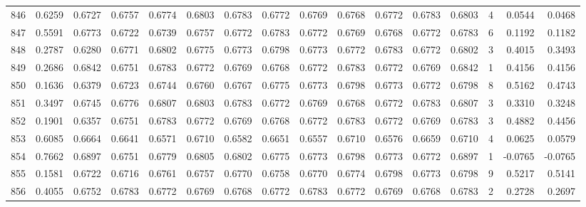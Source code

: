 \begin{tabular}{lrrrrrrrrrrrrrrr}
846 &      0.6259 &  0.6727 &  0.6757 &  0.6774 &  0.6803 &  0.6783 &  0.6772 &  0.6769 &  0.6768 &  0.6772 &   0.6783 &     0.6803 &      4 &                    0.0544 &                     0.0468 \\
847 &      0.5591 &  0.6773 &  0.6722 &  0.6739 &  0.6757 &  0.6772 &  0.6783 &  0.6772 &  0.6769 &  0.6768 &   0.6772 &     0.6783 &      6 &                    0.1192 &                     0.1182 \\
848 &      0.2787 &  0.6280 &  0.6771 &  0.6802 &  0.6775 &  0.6773 &  0.6798 &  0.6773 &  0.6772 &  0.6783 &   0.6772 &     0.6802 &      3 &                    0.4015 &                     0.3493 \\
849 &      0.2686 &  0.6842 &  0.6751 &  0.6783 &  0.6772 &  0.6769 &  0.6768 &  0.6772 &  0.6783 &  0.6772 &   0.6769 &     0.6842 &      1 &                    0.4156 &                     0.4156 \\
850 &      0.1636 &  0.6379 &  0.6723 &  0.6744 &  0.6760 &  0.6767 &  0.6775 &  0.6773 &  0.6798 &  0.6773 &   0.6772 &     0.6798 &      8 &                    0.5162 &                     0.4743 \\
851 &      0.3497 &  0.6745 &  0.6776 &  0.6807 &  0.6803 &  0.6783 &  0.6772 &  0.6769 &  0.6768 &  0.6772 &   0.6783 &     0.6807 &      3 &                    0.3310 &                     0.3248 \\
852 &      0.1901 &  0.6357 &  0.6751 &  0.6783 &  0.6772 &  0.6769 &  0.6768 &  0.6772 &  0.6783 &  0.6772 &   0.6769 &     0.6783 &      3 &                    0.4882 &                     0.4456 \\
853 &      0.6085 &  0.6664 &  0.6641 &  0.6571 &  0.6710 &  0.6582 &  0.6651 &  0.6557 &  0.6710 &  0.6576 &   0.6659 &     0.6710 &      4 &                    0.0625 &                     0.0579 \\
854 &      0.7662 &  0.6897 &  0.6751 &  0.6779 &  0.6805 &  0.6802 &  0.6775 &  0.6773 &  0.6798 &  0.6773 &   0.6772 &     0.6897 &      1 &                   -0.0765 &                    -0.0765 \\
855 &      0.1581 &  0.6722 &  0.6716 &  0.6761 &  0.6757 &  0.6770 &  0.6758 &  0.6770 &  0.6774 &  0.6798 &   0.6773 &     0.6798 &      9 &                    0.5217 &                     0.5141 \\
856 &      0.4055 &  0.6752 &  0.6783 &  0.6772 &  0.6769 &  0.6768 &  0.6772 &  0.6783 &  0.6772 &  0.6769 &   0.6768 &     0.6783 &      2 &                    0.2728 &                     0.2697 \\

\end{tabular}
